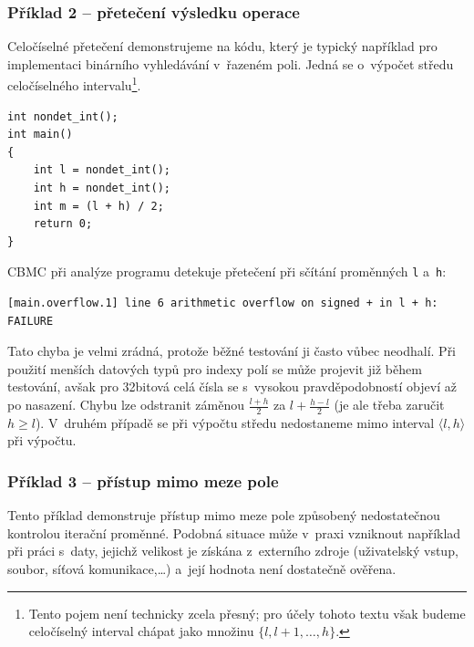 \documentclass[a4paper, 11pt]{article}
\begin{document}
\subsubsection{Příklad 2 -- přetečení výsledku operace}

Celočíselné přetečení demonstrujeme na kódu, který je typický například pro implementaci binárního vyhledávání v~řazeném poli.
Jedná se o~výpočet středu celočíselného intervalu\footnote{Tento pojem není technicky zcela přesný; pro účely tohoto textu však budeme celočíselný interval chápat jako množinu $\{l, l+1, \dots, h\}$.}.

\begin{listing}[ht]
    \caption{Chybný výpočet hodnoty poloviny intervalu $\langle l, h \rangle$.}
    \label{lst:incorrect_mid_point}
    \begin{verbatim}
int nondet_int();
int main()
{
    int l = nondet_int();
    int h = nondet_int();
    int m = (l + h) / 2;
    return 0;
}
    \end{verbatim}
\end{listing}

\noindent CBMC při analýze programu detekuje přetečení při sčítání proměnných \texttt{l} a~\texttt{h}:
\begin{lstlisting}
[main.overflow.1] line 6 arithmetic overflow on signed + in l + h: FAILURE
\end{lstlisting}
Tato chyba je velmi zrádná, protože běžné testování ji často vůbec neodhalí.
Při použití menších datových typů pro indexy polí se může projevit již během testování, avšak pro 32bitová celá čísla se s~vysokou pravděpodobností objeví až po nasazení.
Chybu lze odstranit záměnou $\frac{l+h}{2}$ za $l + \frac{h-l}{2}$ (je ale třeba zaručit $h \geq l$).
V~druhém případě se při výpočtu středu nedostaneme mimo interval $\langle l, h \rangle$ při výpočtu.

\subsubsection{Příklad 3 -- přístup mimo meze pole}

Tento příklad demonstruje přístup mimo meze pole způsobený nedostatečnou kontrolou iterační proměnné.
Podobná situace může v~praxi vzniknout například při práci s~daty, jejichž velikost je získána z~externího zdroje (uživatelský vstup, soubor, síťová komunikace,\dots) a~její hodnota není dostatečně ověřena.
\end{document}
